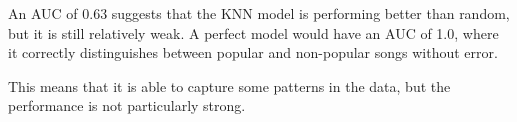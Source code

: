 An AUC of 0.63 suggests that the KNN model is performing better than random, but it is still relatively weak.
A perfect model would have an AUC of 1.0, where it correctly distinguishes between popular and non-popular songs without error.

This means that it is able to capture some patterns in the data, but the performance is not particularly strong. 